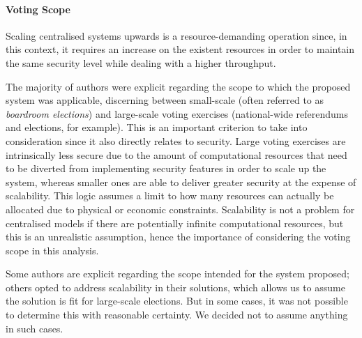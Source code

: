 \documentclass[../access.tex]{subfiles}
\begin{document}
    \paragraph{Voting Scope}
    Scaling centralised systems upwards is a resource-demanding operation since, in this context, it requires an increase on the existent resources in order to maintain the same security level while dealing with a higher throughput.
    \par
    The majority of authors were explicit regarding the scope to which the proposed system was applicable, discerning between small-scale (often referred to as \textit{boardroom elections}) and large-scale voting exercises (national-wide referendums and elections, for example). This is an important criterion to take into consideration since it also directly relates to security. Large voting exercises are intrinsically less secure due to the amount of computational resources that need to be diverted from implementing security features in order to scale up the system, whereas smaller ones are able to deliver greater security at the expense of scalability. This logic assumes a limit to how many resources can actually be allocated due to physical or economic constraints. Scalability is not a problem for centralised models if there are potentially infinite computational resources, but this is an unrealistic assumption, hence the importance of considering the voting scope in this analysis.
    \par
    Some authors are explicit regarding the scope intended for the system proposed; others opted to address scalability in their solutions, which allows us to assume the solution is fit for large-scale elections. But in some cases, it was not possible to determine this with reasonable certainty. We decided not to assume anything in such cases.
    
\end{document}
